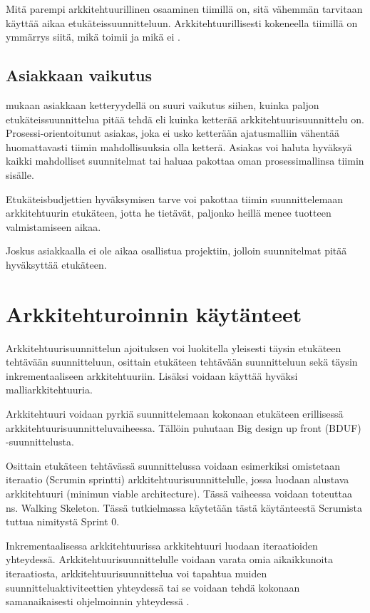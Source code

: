 Mitä parempi arkkitehtuurillinen osaaminen tiimillä on, sitä vähemmän tarvitaan käyttää aikaa etukäteissuunnitteluun. Arkkitehtuurillisesti kokeneella tiimillä on ymmärrys siitä, mikä toimii ja mikä ei \citep{waterman_how_2015}.

\section{Asiakkaan vaikutus}
\citep{waterman_how_2015} mukaan asiakkaan ketteryydellä on suuri vaikutus siihen, kuinka paljon etukäteissuunnittelua pitää tehdä eli kuinka ketterää arkkitehtuurisuunnittelu on. Prosessi-orientoitunut asiakas, joka ei usko ketterään ajatusmalliin vähentää huomattavasti tiimin mahdollisuuksia olla ketterä. Asiakas voi haluta hyväksyä kaikki mahdolliset suunnitelmat tai haluaa pakottaa oman prosessimallinsa tiimin sisälle. 

Etukäteisbudjettien hyväksymisen tarve voi pakottaa tiimin suunnittelemaan arkkitehtuurin etukäteen, jotta he tietävät, paljonko heillä menee tuotteen valmistamiseen aikaa. 

Joskus asiakkaalla ei ole aikaa osallistua projektiin, jolloin suunnitelmat pitää hyväksyttää etukäteen.


\chapter{Arkkitehturoinnin käytänteet}

Arkkitehtuurisuunnittelun ajoituksen voi luokitella yleisesti täysin etukäteen tehtävään suunnitteluun, osittain etukäteen tehtävään suunnitteluun sekä täysin inkrementaaliseen arkkitehtuuriin. Lisäksi voidaan käyttää hyväksi malliarkkitehtuuria.

Arkkitehtuuri voidaan pyrkiä suunnittelemaan kokonaan etukäteen erillisessä arkkitehtuurisuunnitteluvaiheessa. Tällöin puhutaan Big design up front (BDUF) -suunnittelusta. 

Osittain etukäteen tehtävässä suunnittelussa voidaan esimerkiksi omistetaan iteraatio (Scrumin sprintti) arkkitehtuurisuunnittelulle, jossa luodaan alustava arkkitehtuuri (minimun viable architecture). Tässä vaiheessa voidaan toteuttaa ns. Walking Skeleton. Tässä tutkielmassa käytetään tästä käytänteestä Scrumista tuttua nimitystä
Sprint 0.

Inkrementaalisessa arkkitehtuurissa arkkitehtuuri luodaan iteraatioiden yhteydessä. Arkkitehtuurisuunnittelulle voidaan varata omia aikaikkunoita iteraatiosta, arkkitehtuurisuunnittelua voi tapahtua muiden suunnitteluaktiviteettien yhteydessä tai se voidaan tehdä kokonaan samanaikaisesti ohjelmoinnin yhteydessä \cite{rost_distilling_2015}. 

